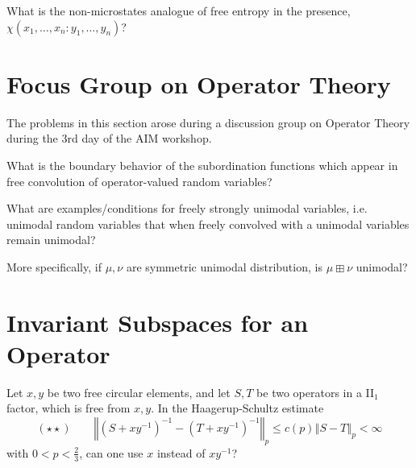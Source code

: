 \documentclass[12pt,letterpaper, reqno]{amsart}
\begin{document}
\begin{problem} What is the non-microstates analogue
of free entropy in the presence,
$\chi(x_{1},\ldots,x_{n}:y_{1},\ldots,y_{n})$?          
\end{problem}

\section{Focus Group on Operator Theory}
The problems in this section arose during a discussion group
on Operator Theory during the 3rd day of the AIM workshop.

\begin{problem}What is the boundary behavior of the subordination
functions which appear in free convolution of operator-valued random
variables?
\end{problem}

\begin{problemblock}
\begin{problem}What are examples/conditions for freely strongly
unimodal variables, i.e. unimodal random variables that when freely
convolved with a unimodal variables remain unimodal?
\end{problem}
\begin{comment}Unimodal means
that the law of the random variable has a smooth density with a unique
maximum; example: Gaussian law or the semicircle law.
\end{comment}
\end{problemblock}

{
\begin{problem} More specifically, if $\mu,\nu$ are symmetric
unimodal distribution, is $\mu\boxplus\nu$ unimodal?
\end{problem}
}

\section{Invariant Subspaces for an Operator}

\begin{problem}
 Let $x,y$ be two free circular elements, and
let $S,T$ be two operators in a II$_{1}$ factor, which is free from
$x,y$. In the Haagerup-Schultz estimate      
   $$(\star\star)\qquad\left\Vert (S+xy^{-1})^{-1}-(T+xy^{-1})^{-1}\right\Vert _{p}\leq c(p)\left\Vert S-T\right\Vert _{p}<\infty$$
with $0<p<\frac{2}{3}$,        
       can one use $x$ instead of $xy^{-1}$?\end{problem}
\end{document}

